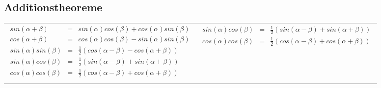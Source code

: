 \subsection{Additionstheoreme}
\begin{tabular}{ll}
 \addtolength{\jot}{2mm}
 \parbox{7cm}{\begin{eqnarray*}
sin( \alpha + \beta ) &=& sin( \alpha)cos( \beta) + cos ( \alpha)sin( \beta)\\
cos( \alpha + \beta ) &=& cos( \alpha)cos( \beta) - sin ( \alpha)sin( \beta)\\
sin( \alpha) sin( \beta) &=& \frac{1}{2}(cos( \alpha - \beta ) - cos(\alpha + \beta))\\
sin( \alpha) cos( \beta) &=& \frac{1}{2}(sin( \alpha - \beta ) + sin(\alpha + \beta))\\
cos( \alpha) cos( \beta) &=& \frac{1}{2}(cos( \alpha - \beta ) + cos(\alpha + \beta))\\
 \end{eqnarray*}}
 &
 \addtolength{\jot}{2mm}
 \parbox{5cm}{\begin{eqnarray*}
sin( \alpha) cos( \beta) &=& \frac{1}{2}(sin( \alpha - \beta ) + sin(\alpha + \beta))\\
cos( \alpha) cos( \beta) &=& \frac{1}{2}(cos( \alpha - \beta ) + cos(\alpha + \beta))\\
  \end{eqnarray*}}
\end{tabular}\\~
